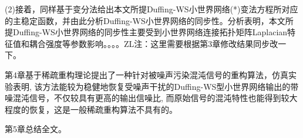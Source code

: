 (2)接着，同样基于变分法给出本文所提Duffing-WS小世界网络(*)变法方程所对应的主稳定函数，并由此分析Duffing-WS小世界网络的同步性。分析表明，本文所提Duffing-WS小世界网络的同步性主要受到小世界网络连接拓扑矩阵Laplacian特征值和耦合强度等参数影响\textcolor[rgb]{0.00,0.00,1.00}{。。。。ZL注：这里需要根据第3章修改结果同步改一下。}

第4章基于稀疏重构理论提出了一种针对被噪声污染混沌信号的重构算法，仿真实验表明, 该方法能较为稳健地恢复受噪声干扰的Duffing-WS型小世界网络输出的带噪混沌信号，不仅较具有更高的输出信噪比, 而原始信号的混沌特性也能得到较大程度的恢复，这是一般稀疏重构算法不具有的。

第5章总结全文。